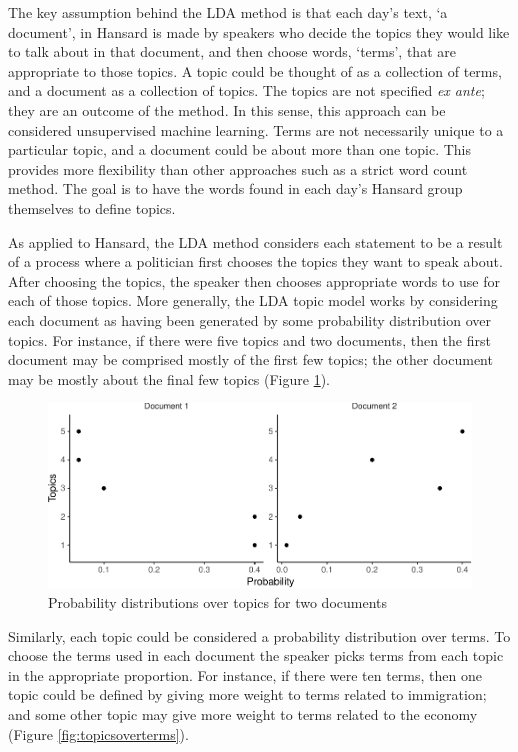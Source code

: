 \documentclass[12pt,]{article}
\theoremstyle{definition}
\theoremstyle{definition}
\theoremstyle{definition}
\theoremstyle{remark}
\begin{document}
The key assumption behind the LDA method is that each day's text, `a
document', in Hansard is made by speakers who decide the topics they
would like to talk about in that document, and then choose words,
`terms', that are appropriate to those topics. A topic could be thought
of as a collection of terms, and a document as a collection of topics.
The topics are not specified \emph{ex ante}; they are an outcome of the
method. In this sense, this approach can be considered unsupervised
machine learning. Terms are not necessarily unique to a particular
topic, and a document could be about more than one topic. This provides
more flexibility than other approaches such as a strict word count
method. The goal is to have the words found in each day's Hansard group
themselves to define topics.

As applied to Hansard, the LDA method considers each statement to be a
result of a process where a politician first chooses the topics they
want to speak about. After choosing the topics, the speaker then chooses
appropriate words to use for each of those topics. More generally, the
LDA topic model works by considering each document as having been
generated by some probability distribution over topics. For instance, if
there were five topics and two documents, then the first document may be
comprised mostly of the first few topics; the other document may be
mostly about the final few topics (Figure
\ref{fig:topicsoverdocuments}).

\begin{figure}
\centering
\includegraphics{svm-rmarkdown-article-example_files/figure-latex/topicsoverdocuments-1.pdf}
\caption{\label{fig:topicsoverdocuments}Probability distributions over
topics for two documents}
\end{figure}

Similarly, each topic could be considered a probability distribution
over terms. To choose the terms used in each document the speaker picks
terms from each topic in the appropriate proportion. For instance, if
there were ten terms, then one topic could be defined by giving more
weight to terms related to immigration; and some other topic may give
more weight to terms related to the economy (Figure
\ref{fig:topicsoverterms}).
\end{document}
